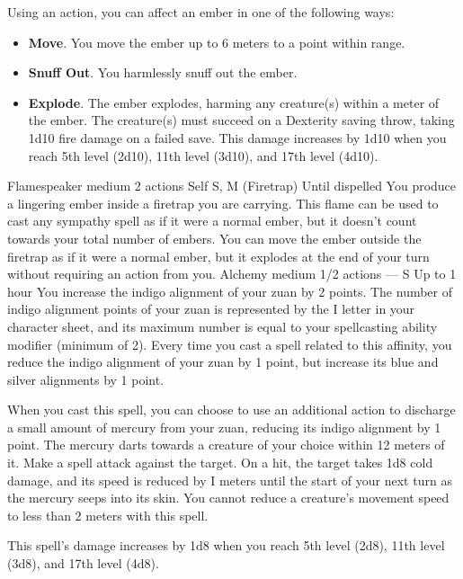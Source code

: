     Using an action, you can affect an ember in one of the following ways:
    \begin{itemize}
        \item \textbf{Move}.
        You move the ember up to 6 meters to a point within range.
        \item \textbf{Snuff Out}.
        You harmlessly snuff out the ember.
        \item \textbf{Explode}.
        The ember explodes, harming any creature(s) within a meter of the ember.
        The creature(s) must succeed on a Dexterity saving throw, taking 1d10 fire damage on a failed save.
        This damage increases by 1d10 when you reach 5th level (2d10), 11th level (3d10), and 17th level (4d10).
    \end{itemize}
    {Flamespeaker medium}
    {2 actions}
    {Self}
    {S, M (Firetrap)}
    {Until dispelled}
    You produce a lingering ember inside a firetrap you are carrying.
    This flame can be used to cast any sympathy spell as if it were a normal ember, but it doesn't count towards your total number of embers.
    You can move the ember outside the firetrap as if it were a normal ember, but it explodes at the end of your turn without requiring an action from you.
    {Alchemy medium}
    {1/2 actions}
    {---}
    {S}
    {Up to 1 hour}
    You increase the indigo alignment of your zuan by 2 points.
    The number of indigo alignment points of your zuan is represented by the I letter in your character sheet, and its maximum number is equal to your spellcasting ability modifier (minimum of 2).
    Every time you cast a spell related to this affinity, you reduce the indigo alignment of your zuan by 1 point, but increase its blue and silver alignments by 1 point.

    When you cast this spell, you can choose to use an additional action to discharge a small amount of mercury from your zuan, reducing its indigo alignment by 1 point.
    The mercury darts towards a creature of your choice within 12 meters of it.
    Make a spell attack against the target.
    On a hit, the target takes 1d8 cold damage, and its speed is reduced by I meters until the start of your next turn as the mercury seeps into its skin.
    You cannot reduce a creature's movement speed to less than 2 meters with this spell.

    This spell's damage increases by 1d8 when you reach 5th level (2d8), 11th level (3d8), and 17th level (4d8).

